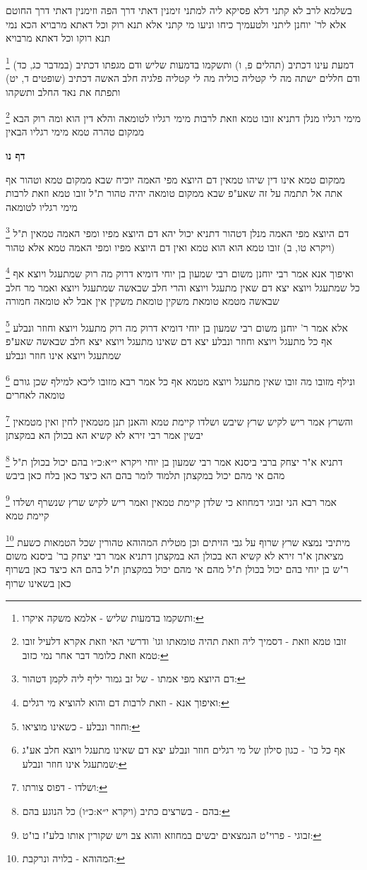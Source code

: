 \documentclass[12pt, openany]{book}
\newcommand{\sethebfont}{
\fontsize{10.5pt}{21.0pt} \selectfont
}
\newcommand{\twocol}[1]{
	{\sethebfont \begin{multicols}{2}
			#1
	\end{multicols}}	
}
\newcommand{\sectname}{}
\newcommand{\newsection}[1]{
	\addcontentsline{toc}{section}{#1}
	\renewcommand{\sectname}{#1}	
	\vspace{-\baselineskip}
	\begin{center}
		\textbf{%
\fontsize{16pt}{16pt}\selectfont
			#1}
	\end{center}
	\vspace{-\baselineskip}
	\nopagebreak
}
\newcommand{\footnotecomment}[1]{
	\renewcommand\thefootnote{}
	\footnote{#1}}
\newcommand{\commenta}[1]{\footnotecomment{#1}}
\begin{document}
{בשלמא לרב לא קתני דלא פסיקא ליה למתני זימנין דאתי דרך הפה וזימנין דאתי דרך החוטם אלא לר' יוחנן ליתני 
ולטעמיך כיחו וניעו מי קתני אלא תנא רוק וכל דאתא מרבויא הכא נמי תנא רוקו וכל דאתא מרבויא 
\commenta{ותשקמו בדמעות שליש - אלמא משקה איקרו:}
דמעת עינו דכתיב (תהלים פ, ו) ותשקמו בדמעות שליש ודם מגפתו דכתיב (במדבר כג, כד) ודם חללים ישתה מה לי קטליה כוליה מה לי קטליה פלגיה חלב האשה דכתיב (שופטים ד, יט) ותפתח את נאד החלב ותשקהו 
\commenta{זובו טמא וזאת - דסמיך ליה וזאת תהיה טומאתו וגו' ודרשי האי וזאת אקרא דלעיל זובו טמא וזאת כלומר דבר אחר נמי כזוב:}
מימי רגליו מנלן דתניא זובו טמא וזאת לרבות מימי רגליו לטומאה והלא דין הוא ומה רוק הבא ממקום טהרה טמא מימי רגליו הבאין}

\newsection{דף נו}
\twocol{ממקום טמא אינו דין שיהו טמאין דם היוצא מפי האמה יוכיח שבא ממקום טמא וטהור אף אתה אל תתמה על זה שאע"פ שבא ממקום טומאה יהיה טהור ת"ל זובו טמא וזאת לרבות מימי רגליו לטומאה 
\commenta{דם היוצא מפי אמתו - של זב גמור יליף ליה לקמן דטהור:}
דם היוצא מפי האמה מנלן דטהור דתניא יכול יהא דם היוצא מפיו ומפי האמה טמאין ת"ל (ויקרא טו, ב) זובו טמא הוא הוא טמא ואין דם היוצא מפיו ומפי האמה טמא אלא טהור 
\commenta{ואיפוך אנא - וזאת לרבות דם והוא להוציא מי רגלים:}
ואיפוך אנא אמר רבי יוחנן משום רבי שמעון בן יוחי דומיא דרוק מה רוק שמתעגל ויוצא אף כל שמתעגל ויוצא יצא דם שאין מתעגל ויוצא 
והרי חלב שבאשה שמתעגל ויוצא ואמר מר חלב שבאשה מטמא טומאת משקין טומאת משקין אין אבל לא טומאה חמורה 
\commenta{וחוזר ונבלע - כשאינו מוציאו:}
אלא אמר ר' יוחנן משום רבי שמעון בן יוחי דומיא דרוק מה רוק מתעגל ויוצא וחוזר ונבלע אף כל מתעגל ויוצא וחוזר ונבלע יצא דם שאינו מתעגל ויוצא יצא חלב שבאשה שאע"פ שמתעגל ויוצא אינו חוזר ונבלע 
\commenta{אף כל כו' - כגון סילון של מי רגלים חוזר ונבלע יצא דם שאינו מתעגל ויוצא חלב אע"ג שמתעגל אינו חוזר ונבלע:}
ונילף מזובו מה זובו שאין מתעגל ויוצא מטמא אף כל אמר רבא מזובו ליכא למילף שכן גורם טומאה לאחרים
\commenta{ושלדו - דפוס צורתו:}
והשרץ אמר ריש לקיש שרץ שיבש ושלדו קיימת טמא והאנן תנן מטמאין לחין ואין מטמאין יבשין אמר רבי זירא לא קשיא הא בכולן הא במקצתן 
\commenta{בהם - בשרצים כתיב (ויקרא י״א:כ״ו) כל הנוגע בהם:}
דתניא א"ר יצחק ברבי ביסנא אמר רבי שמעון בן יוחי {ויקרא י״א:כ״ו } בהם יכול בכולן ת"ל מהם 
אי מהם יכול במקצתן תלמוד לומר בהם הא כיצד כאן בלח כאן ביבש 
\commenta{זבוגי - פרוי"ט הנמצאים יבשים במחוזא והוא צב ויש שקורין אותו בלע"ז בו"ט:}
אמר רבא הני זבוגי דמחוזא כי שלדן קיימת טמאין ואמר ריש לקיש שרץ שנשרף ושלדו קיימת טמא 
\commenta{המהוהא - בלויה ונרקבת:}
מיתיבי נמצא שרץ שרוף על גבי הזיתים וכן מטלית המהוהא טהורין שכל הטמאות כשעת מציאתן א"ר זירא לא קשיא הא בכולן הא במקצתן 
דתניא אמר רבי יצחק בר' ביסנא משום ר"ש בן יוחי בהם יכול בכולן ת"ל מהם 
אי מהם יכול במקצתן ת"ל בהם הא כיצד כאן בשרוף כאן בשאינו שרוף
}
\end{document}
